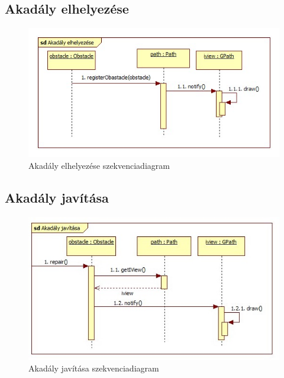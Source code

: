 \subsection{Akadály elhelyezése}
\begin{figure}[H]
\begin{center}
\includegraphics[width=17cm]{chapters/chapter11/images/Akadaly_elhelyezese.jpg}
\caption{Akadály elhelyezése szekvenciadiagram}
\label{fig:Akadaly_elhelyezese}
\end{center}
\end{figure}

\subsection{Akadály javítása}
\begin{figure}[H]
\begin{center}
\includegraphics[width=17cm]{chapters/chapter11/images/Akadaly_javitasa.jpg}
\caption{Akadály javítása szekvenciadiagram}
\label{fig:Akadaly_javitasa}
\end{center}
\end{figure}

